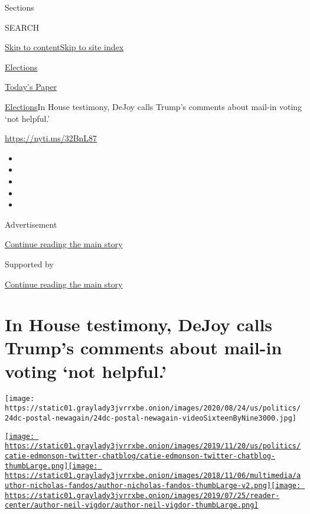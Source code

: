 Sections

SEARCH

\protect\hyperlink{site-content}{Skip to
content}\protect\hyperlink{site-index}{Skip to site index}

\href{https://www.nytimes3xbfgragh.onion/news-event/2020-election}{Elections}

\href{https://myaccount.nytimes3xbfgragh.onion/auth/login?response_type=cookie\&client_id=vi}{}

\href{https://www.nytimes3xbfgragh.onion/section/todayspaper}{Today's
Paper}

\href{/news-event/2020-election}{Elections}\textbar{}In House testimony,
DeJoy calls Trump's comments about mail-in voting `not helpful.'

\url{https://nyti.ms/32BnL87}

\begin{itemize}
\item
\item
\item
\item
\item
\end{itemize}

Advertisement

\protect\hyperlink{after-top}{Continue reading the main story}

Supported by

\protect\hyperlink{after-sponsor}{Continue reading the main story}

\hypertarget{in-house-testimony-dejoy-calls-trumps-comments-about-mail-in-voting-not-helpful}{%
\section{In House testimony, DeJoy calls Trump's comments about mail-in
voting `not
helpful.'}\label{in-house-testimony-dejoy-calls-trumps-comments-about-mail-in-voting-not-helpful}}

\texttt{[image: https://static01.graylady3jvrrxbe.onion/images/2020/08/24/us/politics/24dc-postal-newagain/24dc-postal-newagain-videoSixteenByNine3000.jpg]}

\href{https://www.nytimes3xbfgragh.onion/by/catie-edmondson}{\texttt{[image: https://static01.graylady3jvrrxbe.onion/images/2019/11/20/us/politics/catie-edmonson-twitter-chatblog/catie-edmonson-twitter-chatblog-thumbLarge.png]}}\href{https://www.nytimes3xbfgragh.onion/by/nicholas-fandos}{\texttt{[image: https://static01.graylady3jvrrxbe.onion/images/2018/11/06/multimedia/author-nicholas-fandos/author-nicholas-fandos-thumbLarge-v2.png]}}\href{https://www.nytimes3xbfgragh.onion/by/neil-vigdor}{\texttt{[image: https://static01.graylady3jvrrxbe.onion/images/2019/07/25/reader-center/author-neil-vigdor/author-neil-vigdor-thumbLarge.png]}}

